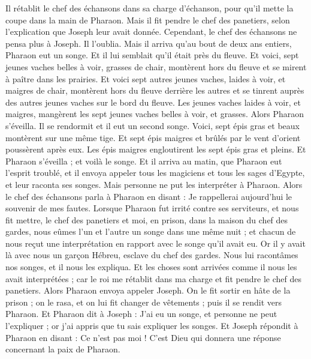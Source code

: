\begin{multicols}{2}
Il rétablit le chef des échansons dans sa charge d'échanson, pour qu'il mette la coupe dans la main de Pharaon.
Mais il fit pendre le chef des panetiers, selon l'explication que Joseph leur avait donnée.
Cependant, le chef des échansons ne pensa plus à Joseph. Il l'oublia.
\VerseOne{}Mais il arriva qu'au bout de deux ans entiers, Pharaon eut un songe. Et il lui semblait qu'il était près du fleuve.
Et voici, sept jeunes vaches belles à voir, grasses de chair, montèrent hors du fleuve et se mirent à paître dans les prairies.
Et voici sept autres jeunes vaches, laides à voir, et maigres de chair, montèrent hors du fleuve derrière les autres et se tinrent auprès des autres jeunes vaches sur le bord du fleuve.
Les jeunes vaches laides à voir, et maigres, mangèrent les sept jeunes vaches belles à voir, et grasses. Alors Pharaon s'éveilla.
Il se rendormit et il eut un second songe. Voici, sept épis gras et beaux montèrent sur une même tige.
Et sept épis maigres et brûlés par le vent d'orient poussèrent après eux.
Les épis maigres engloutirent les sept épis gras et pleins. Et Pharaon s'éveilla ; et voilà le songe.
Et il arriva au matin, que Pharaon eut l'esprit troublé, et il envoya appeler tous les magiciens et tous les sages d'Egypte, et leur raconta ses songes. Mais personne ne put les interpréter à Pharaon.
Alors le chef des échansons parla à Pharaon en disant : Je rappellerai aujourd'hui le souvenir de mes fautes.
Lorsque Pharaon fut irrité contre ses serviteurs, et nous fit mettre, le chef des panetiers et moi, en prison, dans la maison du chef des gardes,
nous eûmes l'un et l'autre un songe dans une même nuit ; et chacun de nous reçut une interprétation en rapport avec le songe qu'il avait eu.
Or il y avait là avec nous un garçon Hébreu, esclave du chef des gardes. Nous lui racontâmes nos songes, et il nous les expliqua.
Et les choses sont arrivées comme il nous les avait interprétées ; car le roi me rétablit dans ma charge et fit pendre le chef des panetiers.
Alors Pharaon envoya appeler Joseph. On le fit sortir en hâte de la prison ; on le rasa, et on lui fit changer de vêtements ; puis il se rendit vers Pharaon.
Et Pharaon dit à Joseph : J'ai eu un songe, et personne ne peut l'expliquer ; or j'ai appris que tu sais expliquer les songes.
Et Joseph répondit à Pharaon en disant : Ce n'est pas moi ! C'est Dieu qui donnera une réponse concernant la paix de Pharaon.

\end{multicols}
